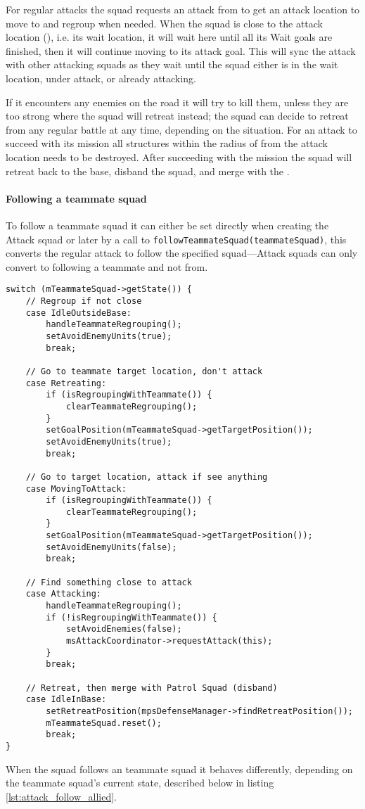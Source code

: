 For regular attacks the squad requests an attack from  to get an
attack location to move to and regroup when needed. When the squad is close to the attack location
(\squadAttackWaitingPositionDistanceFromGoal), i.e. its wait location, it will wait here until all
its Wait goals are finished, then it will continue moving to its attack goal. This will sync the
attack with other attacking squads as they wait until the squad either is in the wait location,
under attack, or already attacking.

If it encounters any enemies on the road it will try to kill them, unless they are too strong where
the squad will retreat instead; the squad can decide to retreat from any regular battle at any time,
depending on the situation. For an attack to succeed with its mission all structures within the
radius of \squadAttackStructuresDestroyedGoalDistance from the attack location needs to be
destroyed. After succeeding with the mission the squad will retreat back to the base, disband the
squad, and merge with the .

\paragraph{Following a teammate squad}
To follow a teammate squad it can either be set directly when creating the Attack squad or later by
a call to \texttt{followTeammateSquad(teammateSquad)}, this converts the regular attack to follow
the specified squad—Attack squads can only convert to following a teammate and not from.


\begin{lstlisting}[caption={Squad actions depending on the teammate squad's state},label={lst:attack_follow_allied}]
switch (mTeammateSquad->getState()) {
	// Regroup if not close
	case IdleOutsideBase:
		handleTeammateRegrouping();
		setAvoidEnemyUnits(true);
		break;
	
	// Go to teammate target location, don't attack
	case Retreating:
		if (isRegroupingWithTeammate()) {
			clearTeammateRegrouping();
		}
		setGoalPosition(mTeammateSquad->getTargetPosition());
		setAvoidEnemyUnits(true);
		break;

	// Go to target location, attack if see anything
	case MovingToAttack: 
		if (isRegroupingWithTeammate()) {
			clearTeammateRegrouping();
		}
		setGoalPosition(mTeammateSquad->getTargetPosition());
		setAvoidEnemyUnits(false);
		break;

	// Find something close to attack
	case Attacking:
		handleTeammateRegrouping();
		if (!isRegroupingWithTeammate()) {
			setAvoidEnemies(false);
			msAttackCoordinator->requestAttack(this);
		}
		break;

	// Retreat, then merge with Patrol Squad (disband)
	case IdleInBase:
		setRetreatPosition(mpsDefenseManager->findRetreatPosition());
		mTeammateSquad.reset();
		break;
}
\end{lstlisting}
When the squad follows an teammate squad it behaves differently, depending on the teammate squad's
current state, described below in listing \ref{lst:attack_follow_allied}.

